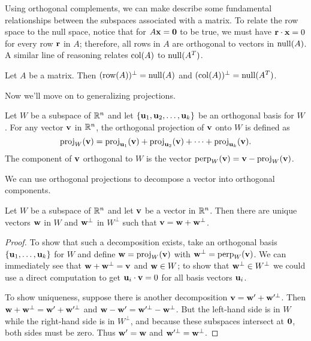 \documentclass[../m073main.tex]{subfiles}
\begin{document}
Using orthogonal complements, we can make describe some fundamental relationships between the subspaces associated with a matrix.
To relate the row space to the null space, notice that for $A \mathbf{x} = \mathbf{0}$ to be true, we must have $\mathbf{r} \cdot \mathbf{x} = 0$ for every row $\mathbf{r}$ in $A$; therefore, all rows in $A$ are orthogonal to vectors in $\operatorname{null}(A)$.
A similar line of reasoning relates $\operatorname{col}(A)$ to $\operatorname{null}(A^T)$. 

\begin{theorem}
	Let $A$ be a matrix.
	Then $(\operatorname{row}(A))^\perp = \operatorname{null}(A)$ and $(\operatorname{col}(A))^\perp = \operatorname{null}(A^T)$.
\end{theorem}

Now we'll move on to generalizing projections.

\begin{definition}
	Let $W$ be a subspace of $\mathbb{R}^n$ and let $\{\mathbf{u}_1, \mathbf{u}_2, \ldots, \mathbf{u}_k\}$ be an orthogonal basis for $W$.
	For any vector $\mathbf{v}$ in $\mathbb{R}^n$, the orthogonal projection of $\mathbf{v}$ onto $W$ is defined as
	\[ \operatorname{proj}_W(\mathbf{v}) = \operatorname{proj}_{\mathbf{u}_1}(\mathbf{v}) + \operatorname{proj}_{\mathbf{u}_2}(\mathbf{v}) + \cdots + \operatorname{proj}_{\mathbf{u}_k}(\mathbf{v}). \]
	The component of $\mathbf{v}$ orthogonal to $W$ is the vector $\operatorname{perp}_W(\mathbf{v}) = \mathbf{v} - \operatorname{proj}_W(\mathbf{v})$.
\end{definition}

We can use orthogonal projections to decompose a vector into orthogonal components.

\begin{theorem}
	Let $W$ be a subspace of $\mathbb{R}^n$ and let $\mathbf{v}$ be a vector in $\mathbb{R}^n$.
	Then there are unique vectors $\mathbf{w}$ in $W$ and $\mathbf{w}^\perp$ in $W^\perp$ such that $\mathbf{v} = \mathbf{w} + \mathbf{w}^\perp$.
\end{theorem}

\begin{proof}
	To show that such a decomposition exists, take an orthogonal basis $\left\{ \mathbf{u}_1, \ldots, \mathbf{u}_k \right\}$ for $W$ and define $\mathbf{w} = \operatorname{proj}_W(\mathbf{v})$ with $\mathbf{w}^\perp = \operatorname{perp}_W(\mathbf{v})$.
	We can immediately see that $\mathbf{w} + \mathbf{w}^\perp = \mathbf{v}$ and $\mathbf{w} \in W$; to show that $\mathbf{w}^\perp \in W^\perp$ we could use a direct computation to get $\mathbf{u}_i \cdot \mathbf{v} = 0$ for all basis vectors $\mathbf{u}_i$.

	To show uniqueness, suppose there is another decomposition $\mathbf{v} = \mathbf{w}' + \mathbf{w}'^\perp$.
	Then $\mathbf{w} + \mathbf{w}^\perp = \mathbf{w}' + \mathbf{w}'^\perp$ and $\mathbf{w} - \mathbf{w}' = \mathbf{w}'^\perp - \mathbf{w}^\perp$.
	But the left-hand side is in $W$ while the right-hand side is in $W^\perp$, and because these subspaces intersect at $\mathbf{0}$, both sides must be zero.
	Thus $\mathbf{w}' = \mathbf{w}$ and $\mathbf{w}'^\perp = \mathbf{w}^\perp$.
\end{proof}
\end{document}
